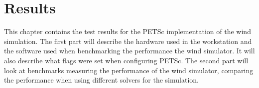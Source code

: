 \chapter{Results}

This chapter contains the test results for the PETSc implementation of the wind
simulation. The first part will describe the hardware used in the workstation
and the software used when benchmarking the performance the
wind simulator. It will also describe what flags were set when configuring PETSc.
The second part will look at benchmarks measuring the performance of the
wind simulator, comparing the performance when using different solvers for the
simulation.




